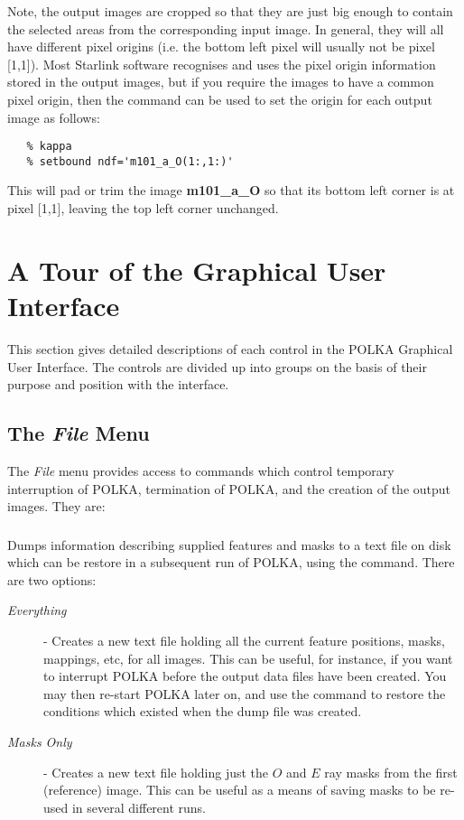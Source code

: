 Note, the output images are cropped so that they are just big enough to
contain the selected areas from the corresponding input image. In
general, they will all have different pixel origins (i.e. the bottom left
pixel will usually not be pixel [1,1]). Most Starlink software recognises
and uses the pixel origin information stored in the output images, but if
you require the images to have a common pixel origin, then the
 command 
can be used to set the origin for each output image as follows:

\begin{verbatim}
   % kappa
   % setbound ndf='m101_a_O(1:,1:)' 
\end{verbatim}

This will pad or trim the image {\bf m101\_a\_O} so that its bottom left 
corner is at pixel [1,1], leaving the top left corner unchanged.

\section {A Tour of the Graphical User Interface}
This section gives detailed descriptions of each control in the POLKA 
Graphical User Interface. The controls are divided up into groups on the
basis of their purpose and position with the interface.

\subsection {The {\em File} Menu}
The {\em File} menu provides access to commands which control
temporary interruption of POLKA,
termination of POLKA, and the creation of the output images. They are:

\subsubsection {} 
Dumps information describing supplied features and masks to a text file 
on disk which can be restore in a subsequent run of POLKA, using the 
 command. There are two
options:

\begin{description}

\item [{\em Everything}] - Creates a new text file holding all the current 
feature positions, masks, mappings, etc, for all images. This can be useful, 
for instance, if you want to interrupt POLKA before the output data files 
have been created. You may then re-start POLKA later on, and use the 
 command to restore the conditions 
which existed when the dump file was created. 

\item [{\em Masks Only}] - Creates a new text file holding just the $O$
and $E$ ray masks from the first (reference) image. This can be useful
as a means of saving masks to be re-used in several different runs.

\end{description}

